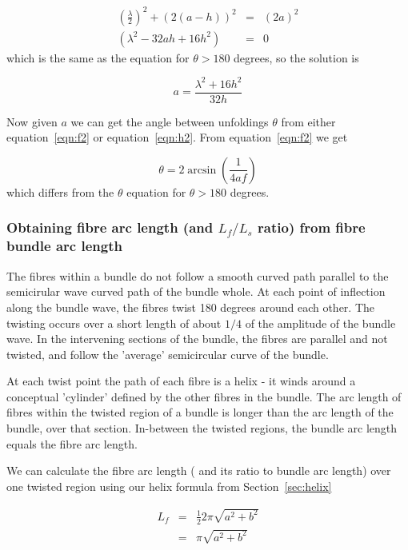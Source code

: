 \documentclass[titlepage,10pt]{article}  %
\begin{document}
\begin{eqnarray*}
\left(\frac{\lambda}{2}\right)^{2} + \left(2(a-h)\right)^{2} & = & \left( 2a \right)^2 \\
 \left(\lambda^{2} - 32 a h + 16h^{2}\right) & = & 0
\end{eqnarray*}
which is the same as the equation for $\theta > 180$ degrees, so the solution is

\begin{displaymath}
a = \frac{\lambda^{2} + 16h^{2}}{32h}
\end{displaymath}

Now given $a$ we can get the angle between unfoldings $\theta$ from either equation~\ref{eqn:f2} or equation~\ref{eqn:h2}. From equation~\ref{eqn:f2} we get

\begin{equation}
\label{eqn:t2}
\theta = 2 \arcsin\left(\frac{1}{4 a f}\right)
\end{equation}
which differs from the $\theta$ equation for $\theta > 180$ degrees.

\subsubsection{Obtaining fibre arc length (and $L_{f}/L_{s}$ ratio) from fibre bundle arc length}
\label{sec:lfls}
The fibres within a bundle do not follow a smooth curved path parallel to the semicirular wave curved path of the bundle whole. At each point of inflection along the bundle wave, the fibres twist 180 degrees around each other. The twisting occurs over a short length of about $1/4$ of the amplitude of the bundle wave. In the intervening sections of the bundle, the fibres are parallel and not twisted, and follow the 'average' semicircular curve of the bundle.

At each twist point the path of each fibre is a helix - it winds around a conceptual 'cylinder' defined by the other fibres in the bundle. The arc length of fibres within the twisted region of a bundle is longer than the arc length of the bundle, over that section. In-between the twisted regions, the bundle arc length equals the fibre arc length.

We can calculate the fibre arc length ( and its ratio to bundle arc length) over one twisted region using our helix formula from Section~\ref{sec:helix}

\begin{eqnarray*}
L_{f} & = & \frac{1}{2} 2 \pi \sqrt{a^{2} + b^{2}} \\
      & = &  \pi \sqrt{a^{2} + b^{2}}
\end{eqnarray*}
 
\end{document}
